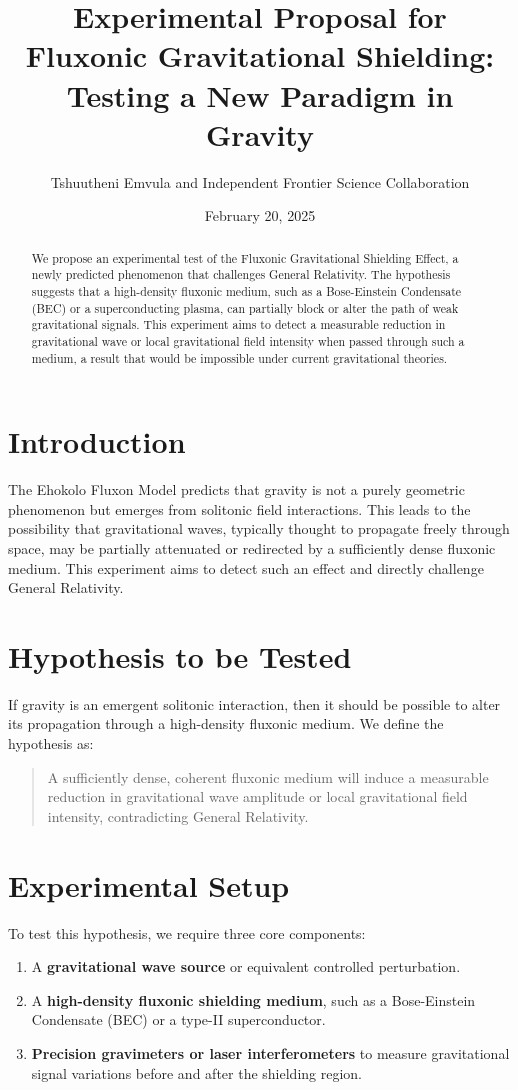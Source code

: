 \documentclass{article}
\title{Experimental Proposal for Fluxonic Gravitational Shielding: Testing a New Paradigm in Gravity}
\author{Tshuutheni Emvula and Independent Frontier Science Collaboration}
\date{February 20, 2025} %
\begin{document}
\maketitle

\begin{abstract}
We propose an experimental test of the Fluxonic Gravitational Shielding Effect, a newly predicted phenomenon that challenges General Relativity. The hypothesis suggests that a high-density fluxonic medium, such as a Bose-Einstein Condensate (BEC) or a superconducting plasma, can partially block or alter the path of weak gravitational signals. This experiment aims to detect a measurable reduction in gravitational wave or local gravitational field intensity when passed through such a medium, a result that would be impossible under current gravitational theories.
\end{abstract}

\section{Introduction}
The Ehokolo Fluxon Model predicts that gravity is not a purely geometric phenomenon but emerges from solitonic field interactions. This leads to the possibility that gravitational waves, typically thought to propagate freely through space, may be partially attenuated or redirected by a sufficiently dense fluxonic medium. This experiment aims to detect such an effect and directly challenge General Relativity.

\section{Hypothesis to be Tested}
If gravity is an emergent solitonic interaction, then it should be possible to alter its propagation through a high-density fluxonic medium. We define the hypothesis as:
\begin{quote}
A sufficiently dense, coherent fluxonic medium will induce a measurable reduction in gravitational wave amplitude or local gravitational field intensity, contradicting General Relativity.
\end{quote}

\section{Experimental Setup}
To test this hypothesis, we require three core components:
\begin{enumerate}
    \item A \textbf{gravitational wave source} or equivalent controlled perturbation.
    \item A \textbf{high-density fluxonic shielding medium}, such as a Bose-Einstein Condensate (BEC) or a type-II superconductor.
    \item \textbf{Precision gravimeters or laser interferometers} to measure gravitational signal variations before and after the shielding region.
\end{enumerate}
\end{document}
